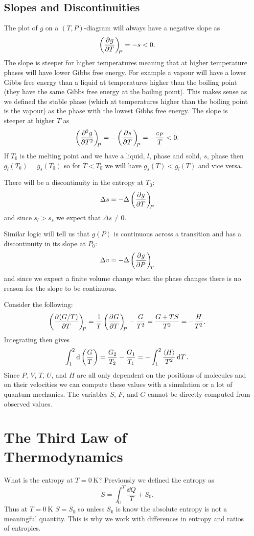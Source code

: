     \subsection{Slopes and Discontinuities}
    The plot of \(g\) on a \((T, P)\)-diagram will always have a negative slope as
    \[\left(\pdv[]{g}{T}\right)_{\!\!{P}} = -s < 0.\]
    The slope is steeper for higher temperatures meaning that at higher temperature phases will have lower Gibbs free energy.
    For example a vapour will have a lower Gibbs free energy than a liquid at temperatures higher than the boiling point (they have the same Gibbs free energy at the boiling point).
    This makes sense as we defined the stable phase (which at temperatures higher than the boiling point is the vapour) as the phase with the lowest Gibbs free energy.
    The slope is steeper at higher \(T\) as
    \[\left(\pdv[2]{g}{T}\right)_{\!\!{P}} = -\left(\pdv[]{s}{T}\right)_{\!\!{P}} = -\frac{c_P}{T} < 0.\]
    If \(T_0\) is the melting point and we have a liquid, \(l\), phase and solid, \(s\), phase then \(g_l(T_0) = g_s(T_0)\) so for \(T < T_0\) we will have \(g_s(T) < g_l(T)\) and vice versa.
    
    There will be a discontinuity in the entropy at \(T_0\):
    \[\Delta s = -\Delta \left(\pdv[]{g}{T}\right)_{\!\!{P}}\]
    and since \(s_l > s_s\) we expect that \(\Delta s \ne 0\).
    
    Similar logic will tell us that \(g(P)\) is continuous across a transition and has a discontinuity in its slope at \(P_0\):
    \[\Delta v = -\Delta\left(\pdv[]{g}{P}\right)_{\!\!{T}}\]
    and since we expect a finite volume change when the phase changes there is no reason for the slope to be continuous.
    
    Consider the following:
    \[\left(\pdv[]{(G/T)}{T}\right)_{\!\!{P}} = \frac{1}{T}\left(\pdv[]{G}{T}\right)_{\!\!{P}} - \frac{G}{T^2} = \frac{G + TS}{T^2} = -\frac{H}{T^2}.\]
    Integrating then gives
    \[\int_1^2 \dd{\left(\frac{G}{T}\right)} = \frac{G_2}{T_2} - \frac{G_1}{T_1} = -\int_{1}^{2} \frac{\langle{H}\rangle}{T^2} \dd{T}.\]
    Since \(P\), \(V\), \(T\), \(U\), and \(H\) are all only dependent on the positions of molecules and on their velocities we can compute these values with a simulation or a lot of quantum mechanics.
    The variables \(S\), \(F\), and \(G\) cannot be directly computed from observed values.
    
    \section{The Third Law of Thermodynamics}
    What is the entropy at \(T = \SI{0}{\kelvin}\)?
    Previously we defined the entropy as
    \[S = \int_{0}^{T} \frac{\dd{Q}}{T} + S_0.\]
    Thus at \(T = \SI{0}{\kelvin}\) \(S = S_0\) so unless \(S_0\) is know the absolute entropy is not a meaningful quantity.
    This is why we work with differences in entropy and ratios of entropies.
    
